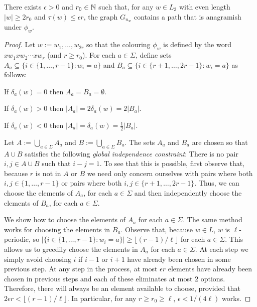 \documentclass{patmorin}
\begin{document}
\begin{lem}\label{anagramish_path}
    There exists $\epsilon>0$ and $r_0\in\mathbb{N}$ such that, for any $w\in L_3$ with even length $|w|\ge 2r_0$ and $\tau(w)\le\epsilon r$, the graph $G_{n_w}$ contains a path that is anagramish under $\phi_w$.
\end{lem}

\begin{proof}
    Let $w:=w_1,\ldots,w_{2r}$ so that the colouring $\phi_w$ is defined by the word $xw_1xw_2\cdots xw_r$ (and $r\ge r_0$).
    For each $a\in\Sigma$, define sets $A_a\subseteq\{i\in \{1,\ldots,r-1\}: w_i=a\}$ and $B_a\subseteq\{i\in\{r+1,\ldots,2r-1\}:w_i=a\}$ as follows:
    \begin{compactenum}
        \item If $\delta_a(w)=0$ then $A_a=B_a=\emptyset$.
        \item If $\delta_a(w)>0$ then $|A_a|=2\delta_a(w)=2|B_a|$.
        \item If $\delta_a(w)<0$ then $|A_a|=\delta_a(w)=\tfrac{1}{2}|B_a|$.
    \end{compactenum}
    Let $A:=\bigcup_{a\in\Sigma} A_a$ and $B:=\bigcup_{a\in\Sigma} B_a$.
    The sets $A_a$ and $B_a$ are chosen so that $A\cup B$ satisfies the following \emph{global independence constraint}:  There is no pair $i,j\in A\cup B$ such that $i-j=1$.  To see that this is possible, first observe that, because $r$ is not in $A$ or $B$ we need only concern ourselves with pairs where both $i,j\in\{1,\ldots,r-1\}$ or pairs where both $i,j\in\{r+1,\ldots,2r-1\}$.  Thus, we can choose the elements of $A_a$, for each $a\in\Sigma$ and then independently choose the elements of $B_a$, for each $a\in\Sigma$.

    We show how to choose the elements of $A_a$ for each $a\in\Sigma$.  The same method works for choosing the elements in $B_a$. Observe that, because $w\in L$, $w$ is $\ell$-periodic, so $|\{i\in \{1,\ldots,r-1\}:w_i=a\}|\ge \lfloor(r-1)/\ell\rfloor$ for each $a\in\Sigma$.  This allows us to greedily choose the elements in $A_a$ for each $a\in\Sigma$. At each step we simply avoid choosing $i$ if $i-1$ or $i+1$ have already been chosen in some previous step.  At any step in the process, at most $\epsilon r$ elements have already been chosen in previous steps and each of these eliminates at most $2$ options.  Therefore, there will always be an element available to choose, provided that $2\epsilon r < \lfloor(r-1)/\ell\rfloor$.  In particular, for any $r\ge r_0\ge \ell$, $\epsilon < 1/(4\ell)$ works.


\end{proof}
\end{document}
